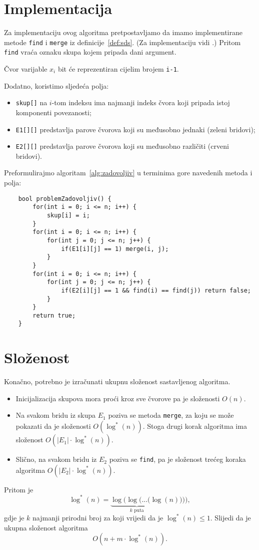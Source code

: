 \documentclass[12pt]{scrartcl}
\begin{document}
\section{Implementacija}

Za implementaciju ovog algoritma pretpostavljamo da imamo implementirane metode \verb`find` i \verb`merge` iz definicije~\ref{def:sds}. (Za implementaciju vidi \cite{singer}.) Pritom \verb`find` vraća oznaku skupa kojem pripada dani argument. 

Čvor varijable $x_i$ bit će reprezentiran cijelim brojem \verb`i-1`.

Dodatno, koristimo sljedeća polja:
\begin{itemize}
    \item \verb`skup[]` na $i$-tom indeksu ima najmanji indeks čvora koji pripada istoj komponenti povezanosti;
    \item \verb`E1[][]` predstavlja parove čvorova koji su međusobno jednaki (zeleni bridovi);
    \item \verb`E2[][]` predstavlja parove čvorova koji su međusobno različiti (crveni bridovi).
\end{itemize}

Preformulirajmo algoritam~\ref{alg:zadovoljiv} u terminima gore navedenih metoda i polja:

\begin{verbatim}
    bool problemZadovoljiv() {
        for(int i = 0; i <= n; i++) {
            skup[i] = i;
        }
        for(int i = 0; i <= n; i++) {
            for(int j = 0; j <= n; j++) {
                if(E1[i][j] == 1) merge(i, j);
            }
        }
        for(int i = 0; i <= n; i++) {
            for(int j = 0; j <= n; j++) {
                if(E2[i][j] == 1 && find(i) == find(j)) return false;
            }
        }
        return true;
    }    
\end{verbatim}

\section{Složenost}
Konačno, potrebno je izračunati ukupnu složenost sastavljenog algoritma. 
\begin{itemize}
    \item Inicijalizacija skupova mora proći kroz sve čvorove pa je složenosti $O(n)$.
    \item Na svakom bridu iz skupa $E_1$ poziva se metoda \verb`merge`, za koju se može pokazati da je složenosti $O(\log^*(n))$. Stoga drugi korak algoritma ima složenost $O(|E_1|\cdot\log^*(n))$.
    \item Slično, na svakom bridu iz $E_2$ poziva se \verb+find+, pa je složenost trećeg koraka algoritma $O(|E_2|\cdot\log^*(n))$.
\end{itemize}

Pritom je 
$$\log^*(n) = \underbrace{\log(\log(...(\log}_\text{$k$ puta}(n)))), $$
gdje je $k$ najmanji prirodni broj za koji vrijedi da je $\log^*(n)\le1$. Slijedi da je ukupna složenost algoritma
\[O(n+m\cdot\log^*(n)). \]

\printbibliography
\end{document}
